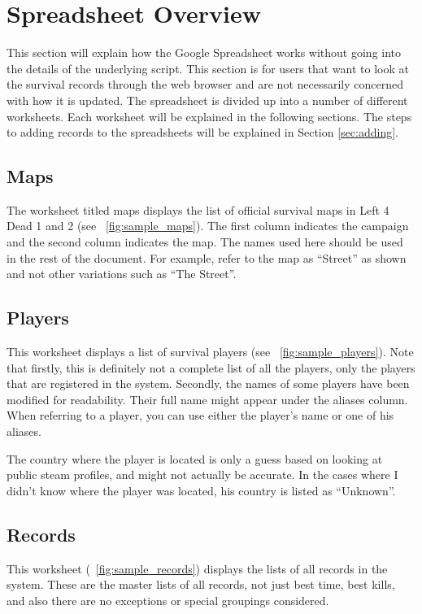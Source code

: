 \section{Spreadsheet Overview}
This section will explain how the Google Spreadsheet works without going into the details of the underlying script. This section is for users that want to look at the survival records through the web browser and are not necessarily concerned with how it is updated. The spreadsheet is divided up into a number of different worksheets. Each worksheet will be explained in the following sections. The steps to adding records to the spreadsheets will be explained in Section \ref{sec:adding}.

\subsection{Maps}
The worksheet titled maps displays the list of official survival maps in Left 4 Dead 1 and 2 (see \figurename\ \ref{fig:sample_maps}). The first column indicates the campaign and the second column indicates the map. The names used here should be used in the rest of the document. For example, refer to the map as ``Street'' as shown and not other variations such as ``The Street''.

\subsection{Players}
This worksheet displays a list of survival players (see \figurename\ \ref{fig:sample_players}). Note that firstly, this is definitely not a complete list of all the players, only the players that are registered in the system. Secondly, the names of some players have been modified for readability. Their full name might appear under the aliases column. When referring to a player, you can use either the player's name or one of his aliases.

The country where the player is located is only a guess based on looking at public steam profiles, and might not actually be accurate. In the cases where I didn't know where the player was located, his country is listed as ``Unknown''.

\subsection{Records}
This worksheet (\figurename\ \ref{fig:sample_records}) displays the lists of all records in the system. These are the master lists of all records, not just best time, best kills, and also there are no exceptions or special groupings considered.

